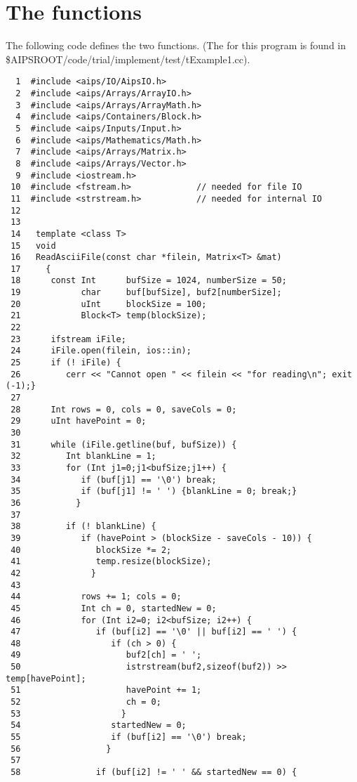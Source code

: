\newpage
\section{The functions}

        The following code defines the two functions.
(The 
for this program is found in 
\$AIPSROOT/code/trial/implement/test/tExample1.cc). 

\begin{verbatim}
  1  #include <aips/IO/AipsIO.h>
  2  #include <aips/Arrays/ArrayIO.h>
  3  #include <aips/Arrays/ArrayMath.h>
  4  #include <aips/Containers/Block.h>
  5  #include <aips/Inputs/Input.h>
  6  #include <aips/Mathematics/Math.h>
  7  #include <aips/Arrays/Matrix.h>
  8  #include <aips/Arrays/Vector.h>
  9  #include <iostream.h>
 10  #include <fstream.h>             // needed for file IO
 11  #include <strstream.h>           // needed for internal IO
 12
 13
 14   template <class T>
 15   void
 16   ReadAsciiFile(const char *filein, Matrix<T> &mat)
 17     {
 18      const Int      bufSize = 1024, numberSize = 50;
 19            char     buf[bufSize], buf2[numberSize];
 20            uInt     blockSize = 100;
 21            Block<T> temp(blockSize);
 22
 23      ifstream iFile;
 24      iFile.open(filein, ios::in);
 25      if (! iFile) {
 26         cerr << "Cannot open " << filein << "for reading\n"; exit (-1);}
 27
 28      Int rows = 0, cols = 0, saveCols = 0;
 29      uInt havePoint = 0;
 30
 31      while (iFile.getline(buf, bufSize)) {
 32         Int blankLine = 1;
 33         for (Int j1=0;j1<bufSize;j1++) {
 34            if (buf[j1] == '\0') break;
 35            if (buf[j1] != ' ') {blankLine = 0; break;}
 36           }
 37
 38         if (! blankLine) {
 39            if (havePoint > (blockSize - saveCols - 10)) {
 40               blockSize *= 2;
 41               temp.resize(blockSize);
 42              }
 43
 44            rows += 1; cols = 0;
 45            Int ch = 0, startedNew = 0;
 46            for (Int i2=0; i2<bufSize; i2++) {
 47               if (buf[i2] == '\0' || buf[i2] == ' ') {
 48                  if (ch > 0) {
 49                     buf2[ch] = ' ';
 50                     istrstream(buf2,sizeof(buf2)) >>  temp[havePoint];
 51                     havePoint += 1;
 52                     ch = 0;
 53                    }
 54                  startedNew = 0;
 55                  if (buf[i2] == '\0') break;
 56                 }
 57
 58               if (buf[i2] != ' ' && startedNew == 0) {

\end{verbatim}
